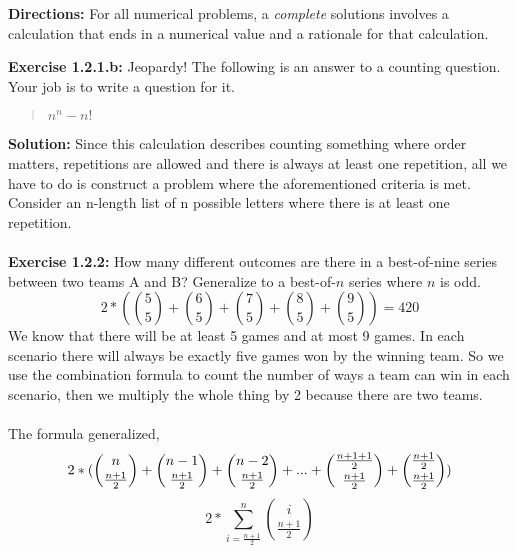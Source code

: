 \documentclass{amsart}
\begin{document}
\thispagestyle{fancy}

\textbf{Directions:} For all numerical problems, a \emph{complete} solutions involves a calculation that ends in a numerical value and a rationale for that calculation.

\noindent\textbf{Exercise 1.2.1.b: }Jeopardy! The following is an answer to a counting question. Your job is to write a question  for it.
\begin{quote} $n^n-n!$ \end{quote}
\noindent \textbf{Solution:} Since this calculation describes counting something where order matters, repetitions are allowed and there is always at least one repetition, all we have to do is construct a problem where the aforementioned criteria is met. Consider an n-length list of n possible letters where there is at least one repetition.\\\\


\noindent\textbf{Exercise 1.2.2: } How many different outcomes are there in a best-of-nine series between two teams A and B? Generalize to a best-of-$n$ series where $n$ is odd.\\
\begin{equation}
2*( {5 \choose 5} +{6 \choose 5}+{7 \choose 5}+{8 \choose 5}+{9 \choose 5} )=420
\end{equation}
We know that there will be at least 5 games and at most 9 games. In each scenario there will always be exactly five games won by the winning team. So we use the combination formula to count the number of ways a team can win in each scenario, then we multiply the whole thing by 2 because there are two teams.\\\\
The formula generalized,
\begin{equation}
2*( {n \choose \frac{n+1}{2}} +{n-1 \choose \frac{n+1}{2}}+{n-2 \choose \frac{n+1}{2}}+...+{\frac{n+1+1}{2} \choose \frac{n+1}{2}}+{\frac{n+1}{2} \choose \frac{n+1}{2}} )\\
\end{equation}
\begin{equation}
2*\sum_{i=\frac{n+1}{2}}^{n}{i \choose \frac{n+1}{2}}
\end{equation}
\end{document}

